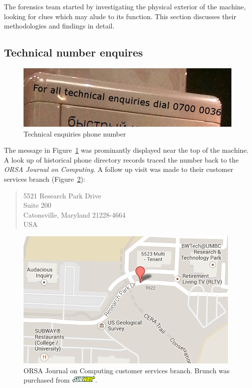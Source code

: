 The forensics team started by investigating the physical exterior of the machine, looking for clues which may alude to its function. This section discusses their methodologies and findings in detail.


\subsection{Technical number enquires}

\begin{figure}[h]
	\centering
	\includegraphics[width=0.8\columnwidth]{img/phone-enquiries.jpg}
	\caption{Technical enquiries phone number}
	\label{fig:technical-enquiries}
\end{figure}

The message in Figure~\ref{fig:technical-enquiries} was prominantly displayed near the top of the machine. A look up of historical phone directory records traced the number back to the \emph{ORSA Journal on Computing}. 
A follow up visit was made to their customer services branch (Figure~\ref{fig:orsa-map}):

\begin{quote}
5521 Research Park Drive \\
Suite 200 \\
Catonsville, Maryland 21228-4664 \\
USA
\end{quote}

\begin{figure}[h]
	\centering
	\includegraphics[width=0.8\columnwidth]{img/orsa.png}
	\caption{ORSA Journal on Computing customer services branch. Brunch was purchased from \protect \includegraphics[height=0.98em,keepaspectratio]{img/subway.png}.}
	\label{fig:orsa-map}
\end{figure}

